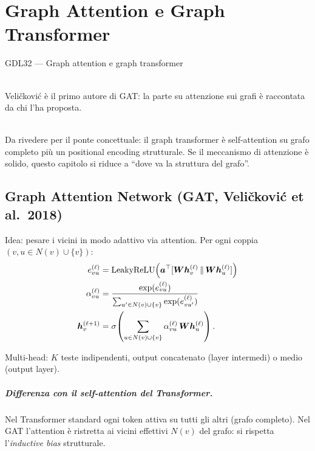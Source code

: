 \chapter{Graph Attention e Graph Transformer}
\label{ch:gat}

\begin{risorsevideo}{GDL32 — Graph attention e graph transformer}

\medskip
{}\\
Veličković è il primo autore di GAT: la parte su attenzione sui grafi è raccontata da chi l'ha proposta.

\medskip
{}\\
Da rivedere per il ponte concettuale: il graph transformer è self-attention su grafo completo più un positional encoding strutturale. Se il meccanismo di attenzione è solido, questo capitolo si riduce a ``dove va la struttura del grafo''.
\end{risorsevideo}

\section{Graph Attention Network (GAT, Veličković et al.\ 2018)}

Idea: pesare i vicini in modo adattivo via attention. Per ogni coppia $(v, u \in N(v) \cup \{v\})$:
\begin{align}
e_{vu}^{(\ell)} &= \mathrm{LeakyReLU}\!\left(\bm{a}^\top [\bm{W}\bm{h}_v^{(\ell)} \,\|\, \bm{W}\bm{h}_u^{(\ell)}]\right)\\
\alpha_{vu}^{(\ell)} &= \frac{\exp(e_{vu}^{(\ell)})}{\sum_{u'\in N(v)\cup\{v\}} \exp(e_{vu'}^{(\ell)})}\\
\bm{h}_v^{(\ell+1)} &= \sigma\!\left(\sum_{u\in N(v)\cup\{v\}} \alpha_{vu}^{(\ell)}\, \bm{W}\bm{h}_u^{(\ell)}\right).
\end{align}

Multi-head: $K$ teste indipendenti, output concatenato (layer intermedi) o medio (output layer).

\paragraph{Differenza con il self-attention del Transformer.} Nel Transformer standard ogni token attiva su tutti gli altri (grafo completo). Nel GAT l'attention è ristretta ai vicini effettivi $N(v)$ del grafo: si rispetta l'\emph{inductive bias} strutturale.


